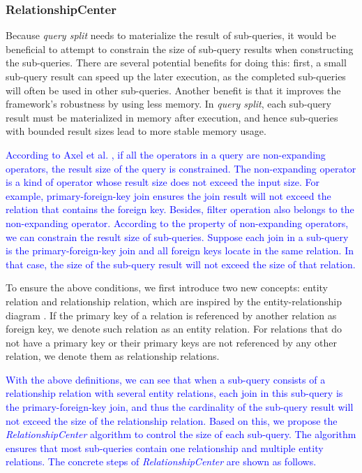     \subsubsection{RelationshipCenter} \label{S412}
        Because \textit{query split} needs to materialize the result of sub-queries, it would be beneficial to attempt to constrain the size of sub-query results when constructing the sub-queries. There are several potential benefits for doing this: first, a small sub-query result can speed up the later execution, as the completed sub-queries will often be used in other sub-queries. Another benefit is that it improves the framework's robustness by using less memory. In \textit{query split}, each sub-query result must be materialized in memory after execution, and hence sub-queries with bounded result sizes lead to more stable memory usage.\par
\textcolor{blue}{
        According to Axel et al. \cite{USE}, if all the operators in a query are non-expanding operators, the result size of the query is constrained. The non-expanding operator is a kind of operator whose result size does not exceed the input size. For example, primary-foreign-key join ensures the join result will not exceed the relation that contains the foreign key. Besides, filter operation also belongs to the non-expanding operator. According to the property of non-expanding operators, we can constrain the result size of sub-queries. Suppose each join in a sub-query is the primary-foreign-key join and all foreign keys locate in the same relation. In that case, the size of the sub-query result will not exceed the size of that relation.
}\par
        To ensure the above conditions, we first introduce two new concepts: entity relation and relationship relation, which are inspired by the entity-relationship diagram \cite{paper32}. If the primary key of a relation is referenced by another relation as foreign key, we denote such relation as an entity relation. For relations that do not have a primary key or their primary keys are not referenced by any other relation, we denote them as relationship relations.\par
\textcolor{blue}{
        With the above definitions, we can see that when a sub-query consists of a relationship relation with several entity relations, each join in this sub-query is the primary-foreign-key join, and thus the cardinality of the sub-query result will not exceed the size of the relationship relation. Based on this, we propose the \textit{RelationshipCenter} algorithm to control the size of each sub-query. The algorithm ensures that most sub-queries contain one relationship and multiple entity relations. The concrete steps of \textit{RelationshipCenter} are shown as follows.
}
